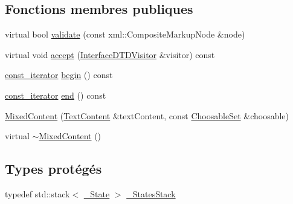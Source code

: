 \subsection*{Fonctions membres publiques}
\begin{DoxyCompactItemize}
\item 
virtual bool \hyperlink{classdtd_1_1_mixed_content_a675bca1039d5dd8cced7fddb856428fd}{validate} (const xml::CompositeMarkupNode \&node)
\item 
virtual void \hyperlink{classdtd_1_1_mixed_content_aea7a1312dc631047db037c84899f7a05}{accept} (\hyperlink{classdtd_1_1_interface_d_t_d_visitor}{InterfaceDTDVisitor} \&visitor) const 
\item 
\hyperlink{classdtd_1_1_mixed_content_a801684f467b642e9e2de6297585ccf7b}{const\_\-iterator} \hyperlink{classdtd_1_1_mixed_content_ae329052b86f20252a7adeab321b35379}{begin} () const 
\item 
\hyperlink{classdtd_1_1_mixed_content_a801684f467b642e9e2de6297585ccf7b}{const\_\-iterator} \hyperlink{classdtd_1_1_mixed_content_a1d33a3179772862e611c962b23b7ff38}{end} () const 
\item 
\hyperlink{classdtd_1_1_mixed_content_ab853de43d13c98055cce02fa0175e3b2}{MixedContent} (\hyperlink{classdtd_1_1_text_content}{TextContent} \&textContent, const \hyperlink{classdtd_1_1_mixed_content_ab8f0c26935279ce90ebb5bb22b244088}{ChoosableSet} \&choosable)
\item 
virtual \hyperlink{classdtd_1_1_mixed_content_acadef0055c07eeecb917f503d9824df7}{$\sim$MixedContent} ()
\end{DoxyCompactItemize}
\subsection*{Types protégés}
\begin{DoxyCompactItemize}
\item 
typedef std::stack$<$ \hyperlink{structdtd_1_1_quantifiable_content_1_1___state}{\_\-State} $>$ \hyperlink{classdtd_1_1_mixed_content_af406cf95bf434a84082758aab801296d}{\_\-StatesStack}
\end{DoxyCompactItemize}
